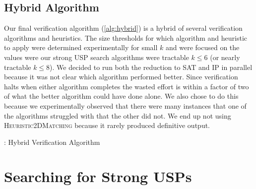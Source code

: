 \documentclass[11pt]{article}
\begin{document}



\subsection{Hybrid Algorithm}

Our final verification algorithm (\autoref{alg:hybrid}) is a hybrid of
several verification algorithms and heuristics.  The size thresholds
for which algorithm and heuristic to apply were determined
experimentally for small $k$ and were focused on the values were our
strong USP search algorithms were tractable $k \le 6$ (or nearly
tractable $k \le 8$).  We decided to run both the reduction to SAT and
IP in parallel because it was not clear which algorithm performed
better.  Since verification halts when either algorithm completes the
wasted effort is within a factor of two of what the better algorithm
could have done alone.  We also chose to do this because we
experimentally observed that there were many instances that one of the
algorithms struggled with that the other did not.  We end up not using
\textsc{Heuristic2DMatching} because it rarely produced definitive
output.

\begin{algorithm}[t]
  \caption{: Hybrid Verification Algorithm}
  \label{alg:hybrid}
\begin{algorithmic}[1]
    \EndIf
    \EndIf
    \EndIf
  \EndFunction
\end{algorithmic}
\end{algorithm}

\section{Searching for Strong USPs}
\label{sec:search}
\end{document}
